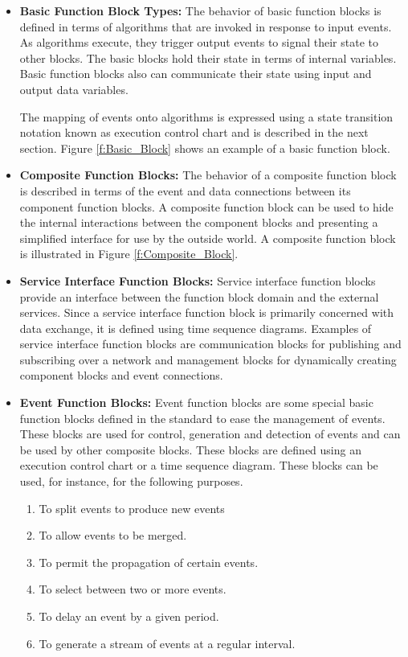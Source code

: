 \begin{itemize}
\item{\bf Basic Function Block Types:} The behavior of basic
function blocks is defined in terms of algorithms that are invoked
in response to input events. As algorithms execute, they trigger
output events to signal their state to other blocks. The basic
blocks hold their state in terms of internal variables. Basic
function blocks also can communicate their state using input and
output data variables.

The mapping of events onto algorithms is expressed using a state
transition notation known as execution control chart and is
described in the next section. Figure \ref{f:Basic_Block} shows an
example of a basic function block.

\item{\bf Composite Function Blocks:} The behavior of a composite
function block is described in terms of the event and data
connections between its component function blocks. A composite
function block can be used to hide the internal interactions
between the component blocks and presenting a simplified interface
for use by the outside world. A composite function block is
illustrated in Figure \ref{f:Composite_Block}.

\item {\bf Service Interface Function Blocks:} Service interface
function blocks provide an interface between the function block
domain and the external services. Since a service interface
function block is primarily concerned with data exchange, it is
defined using time sequence diagrams. Examples of service
interface function blocks are communication blocks for publishing
and subscribing over a network and management blocks for
dynamically creating component blocks and event connections.

\item {\bf Event Function Blocks:} Event function blocks are some
special basic function blocks defined in the standard to ease the
management of events. These blocks are used for control,
generation and detection of events and can be used by other
composite blocks. These blocks are defined using an execution
control chart or a time sequence diagram. These blocks can be
used, for instance, for the following purposes.
\begin{enumerate}
\item To split events to produce new events
\item To allow events to be merged.
\item To permit the propagation of certain events.
\item To select between two or more events.
\item To delay an event by a given period.
\item To generate a stream of events at a regular interval.
\end{enumerate}

\end{itemize}

